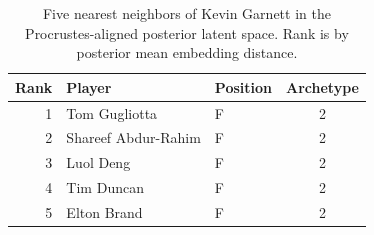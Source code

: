 \begin{table}[htbp]
  \centering\small
  \begin{tabular}{rllc}
    \toprule
    Rank & Player & Position & Archetype \\
    \midrule
    1 & Tom Gugliotta & F & 2 \\
    2 & Shareef Abdur-Rahim & F & 2 \\
    3 & Luol Deng & F & 2 \\
    4 & Tim Duncan & F & 2 \\
    5 & Elton Brand & F & 2 \\
    \bottomrule
  \end{tabular}
  \caption{Five nearest neighbors of Kevin Garnett in the Procrustes-aligned posterior latent space. Rank is by posterior mean embedding distance.}
  \label{tab:Kevin_Garnett_neighbors}
\end{table}

